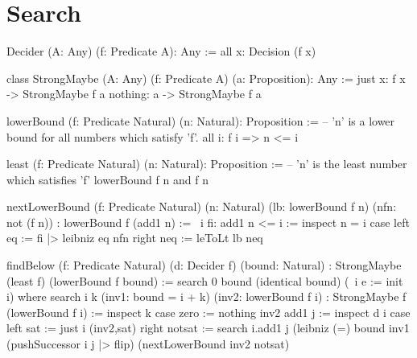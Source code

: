 \vskip 5mm
\section{Search}

\begin{alba}
    Decider (A: Any) (f: Predicate A): Any :=
        all x: Decision (f x)

    class StrongMaybe (A: Any) (f: Predicate A) (a: Proposition): Any :=
        just x: f x -> StrongMaybe f a
        nothing: a -> StrongMaybe f a

    lowerBound (f: Predicate Natural) (n: Natural): Proposition :=
            -- 'n' is a lower bound for all numbers which satisfy 'f'.
        all i: f i => n <= i

    least (f: Predicate Natural) (n: Natural): Proposition :=
            -- 'n' is the least number which satisfies 'f'
        lowerBound f n and f n

    nextLowerBound
        (f: Predicate Natural) (n: Natural)
        (lb: lowerBound f n) (nfn: not (f n))
        : lowerBound f (add1 n)
    :=
        \ i fi: add1 n <= i :=
            inspect n = i case
                left eq :=
                    fi |> leibniz eq nfn
                right neq :=
                    leToLt lb neq

    findBelow
        (f: Predicate Natural)
        (d: Decider f)
        (bound: Natural)
        : StrongMaybe (least f) (lowerBound f bound)
    :=
        search 0 bound (identical bound) (\ i e := init i)
        where
            search
                i k
                (inv1: bound = i + k)
                (inv2: lowerBound f i)
                : StrongMaybe f (lowerBound f i)
            :=
                inspect k case
                    zero :=
                        nothing inv2
                    add1 j :=
                        inspect d i case
                            left sat :=
                                just i (inv2,sat)
                            right notsat :=
                                search
                                    i.add1
                                    j
                                    (leibniz
                                        {(=) bound}
                                        inv1
                                        (pushSuccessor {i} {j} |> flip)
                                    (nextLowerBound inv2 notsat)
\end{alba}


